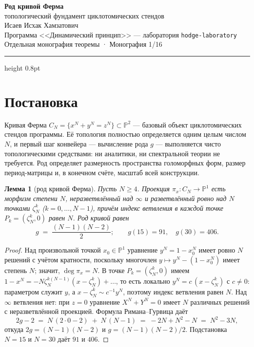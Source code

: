 \documentclass[11pt,a4paper]{article}
\theoremstyle{plain}
\newtheorem{lemma}[theorem]{Лемма}
\theoremstyle{definition}
\theoremstyle{remark}
\begin{document}
\begin{center}
{\LARGE\bfseries Род кривой Ферма}\\[0.4em]
{\large топологический фундамент циклотомических стендов}\\[0.6em]
{\normalsize Исаев Исхак Хамзатович}\\[0.2em]
{\small Программа <<Динамический принцип>> --- лаборатория \texttt{hodge-laboratory}}\\[0.15em]
{\small Отдельная монография теоремы · Монография 1/16}
\end{center}
\vspace{0.4em}
{\color{linkblue}\hrule height 0.8pt}
\vspace{0.8em}

\section{Постановка}

Кривая Ферма $C_N=\{x^N+y^N=z^N\}\subset\mathbb{P}^2$ --- базовый
объект циклотомических стендов программы. Её топология полностью
определяется одним целым числом $N$, и первый шаг конвейера ---
вычисление рода $g$ --- выполняется чисто топологическими
средствами: ни аналитики, ни спектральной теории не требуется. Род
определяет размерность пространства голоморфных форм, размер
период-матрицы и, в конечном счёте, масштаб всей конструкции.

\begin{lemma}[род кривой Ферма]\label{lem:genus}
Пусть $N\ge 4$. Проекция $\pi_x\colon C_N\to\mathbb{P}^1$ есть
морфизм степени $N$, неразветвлённый над $\infty$ и разветвлённый
ровно над $N$ точками $\zeta_N^k$ ($k=0,\dots,N-1$), причём индекс
ветвления в каждой точке $P_k=(\zeta_N^k,0)$ равен $N$. Род кривой
равен
\[
  g \;=\; \frac{(N-1)(N-2)}{2};
  \qquad
  g(15)=91,\quad g(30)=406 .
\]
\end{lemma}

\begin{proof}
Над произвольной точкой $x_0\in\mathbb{P}^1$ уравнение
$y^N=1-x_0^N$ имеет ровно $N$ решений с учётом кратности, поскольку
многочлен $y\mapsto y^N-(1-x_0^N)$ имеет степень $N$; значит,
$\deg\pi_x=N$. В точке $P_k=(\zeta_N^k,0)$ имеем
$1-x^N=-N\zeta_N^{k(N-1)}(x-\zeta_N^k)+\dots$, то есть локально
$y^N=c\,(x-\zeta_N^k)$ с $c\ne0$: параметром служит $y$, а
$x-\zeta_N^k\sim c^{-1}y^N$, поэтому индекс ветвления равен $N$.
Над $\infty$ ветвления нет: при $z=0$ уравнение $X^N+Y^N=0$ имеет
$N$ различных решений с неразветвлённой проекцией. Формула
Римана--Гурвица даёт
\[
  2g-2 \;=\; N\,(2\cdot 0-2) \;+\; N\,(N-1)
  \;=\; -2N + N^2 - N \;=\; N^2-3N,
\]
откуда $2g=(N-1)(N-2)$ и $g=(N-1)(N-2)/2$. Подстановка $N=15$ и
$N=30$ даёт $91$ и $406$.
\end{proof}
\end{document}
